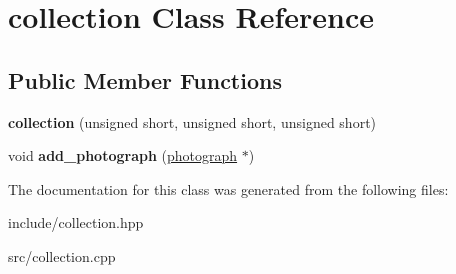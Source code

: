 \hypertarget{classcollection}{}\section{collection Class Reference}
\label{classcollection}
\subsection*{Public Member Functions}
\begin{DoxyCompactItemize}
\item 
{\bfseries collection} (unsigned short, unsigned short, unsigned short)\hypertarget{classcollection_adc9e8e494d7b8d3992fd10e469c162b9}{}\label{classcollection_adc9e8e494d7b8d3992fd10e469c162b9}

\item 
void {\bfseries add\+\_\+photograph} (\hyperlink{classphotograph}{photograph} $\ast$)\hypertarget{classcollection_abd6611535baa2454ca5076053bb8e1fd}{}\label{classcollection_abd6611535baa2454ca5076053bb8e1fd}

\end{DoxyCompactItemize}


The documentation for this class was generated from the following files\+:\begin{DoxyCompactItemize}
\item 
include/collection.\+hpp\item 
src/collection.\+cpp\end{DoxyCompactItemize}
